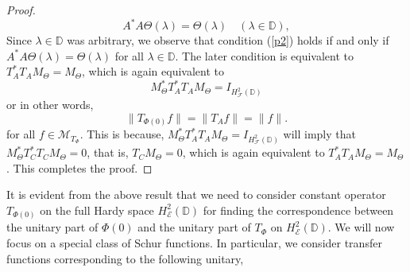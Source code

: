 \documentclass[12pt]{amsart}
\numberwithin{equation}{section}
\theoremstyle{definition}
\newcommand{\D}{\mathbb{D}}
\newcommand{\1}{{\mbox{\bf 1}}}
\newcommand{\cle}{\mathcal{E}}
\newcommand{\clf}{\mathcal{F}}
\newcommand{\clm}{\mathcal{M}}
\newcommand{\raro}{\rightarrow}
\begin{document}
\begin{proof}
\[
A^*A \Theta(\lambda) =  \Theta(\lambda) \quad (\lambda \in \D),
\]
Since $\lambda \in \D$ was arbitrary, we observe that condition (\ref{p2}) holds if and only if $A^*A \Theta(\lambda) =  \Theta(\lambda)$ for all $\lambda \in \D$. The later condition is equivalent to $T_A^*T_A M_{\Theta} = M_{\Theta}$, which is again equivalent to 
\[
M_{\Theta}^* T_A^* T_A M_{\Theta} =  I_{H_{\clf}^2(\D)}
\]
or in other words, 
\[
\|T_{\Phi(0)} f\| = \|T_{A} f\| = \|f\|.
\]
for all $f \in \clm_{T_{\Phi}}$.  This is because, $M_{\Theta}^* T_A^* T_A M_{\Theta} =  I_{H_{\clf}^2(\D)}$ will imply that $M_{\Theta}^* T_C^* T_C M_{\Theta} = 0$, that is, $T_C M_{\Theta} = 0$, which is again equivalent to $T_A^*T_A M_{\Theta} =  M_{\Theta}$. This completes the proof.
\end{proof}
It is evident from the above result that we need to consider constant operator $T_{\Phi(0)}$ on the full Hardy space $H_{\cle}^2(\D)$ for finding the correspondence between the unitary part of $\Phi(0)$ and the unitary part of $T_{\Phi}$ on $H_{\cle}^2(\D)$.  We will now focus on a special class of Schur functions. In particular, we consider transfer functions corresponding to the following unitary,
\end{document}

